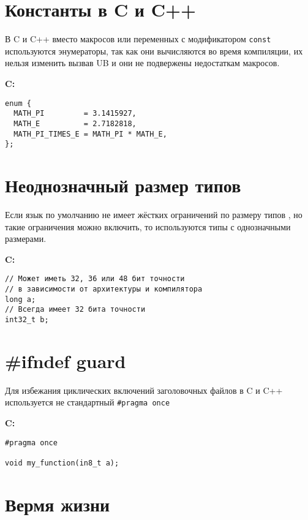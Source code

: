 \documentclass[12p]{article}
\begin{document}
\section{Константы в C и C++}

В C и C++ вместо макросов или переменных с модификатором \texttt{const} используются энумераторы, так как они вычисляются во время компиляции, их нельзя изменить вызвав UB и они не подвержены недостаткам макросов.\newline

\textbf{C:}
\begin{verbatim}
enum {
  MATH_PI         = 3.1415927,
  MATH_E          = 2.7182818,
  MATH_PI_TIMES_E = MATH_PI * MATH_E,
};
\end{verbatim}

\section{Неоднозначный размер типов}

Если язык по умолчанию не имеет жёстких ограничений по размеру типов \cite{data_type_sizes}, но такие ограничения можно включить, то используются типы с однозначными размерами.\newline

\textbf{C:}
\begin{verbatim}
// Может иметь 32, 36 или 48 бит точности
// в зависимости от архитектуры и компилятора
long a;
// Всегда имеет 32 бита точности
int32_t b;
\end{verbatim}

\section{\#ifndef guard}

Для избежания циклических включений заголовочных файлов в C и C++ используется не стандартный \texttt{#pragma once} \newline

\textbf{C:}
\begin{verbatim}
#pragma once

void my_function(in8_t a);
\end{verbatim}
\pagebreak

\section{Вермя жизни}
\end{document}
